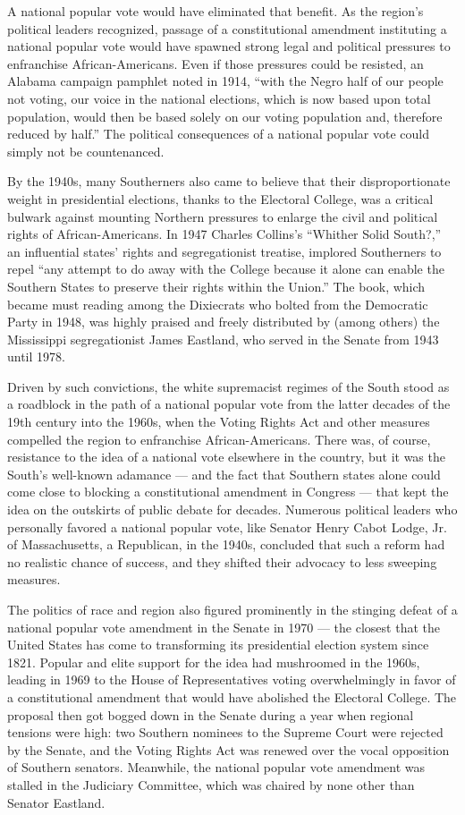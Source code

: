 A national popular vote would have eliminated that benefit. As the
region's political leaders recognized, passage of a constitutional
amendment instituting a national popular vote would have spawned strong
legal and political pressures to enfranchise African-Americans. Even if
those pressures could be resisted, an Alabama campaign pamphlet noted in
1914, ``with the Negro half of our people not voting, our voice in the
national elections, which is now based upon total population, would then
be based solely on our voting population and, therefore reduced by
half.'' The political consequences of a national popular vote could
simply not be countenanced.

By the 1940s, many Southerners also came to believe that their
disproportionate weight in presidential elections, thanks to the
Electoral College, was a critical bulwark against mounting Northern
pressures to enlarge the civil and political rights of
African-Americans. In 1947 Charles Collins's ``Whither Solid South?,''
an influential states' rights and segregationist treatise, implored
Southerners to repel ``any attempt to do away with the College because
it alone can enable the Southern States to preserve their rights within
the Union.'' The book, which became must reading among the Dixiecrats
who bolted from the Democratic Party in 1948, was highly praised and
freely distributed by (among others) the Mississippi segregationist
James Eastland, who served in the Senate from 1943 until 1978.

Driven by such convictions, the white supremacist regimes of the South
stood as a roadblock in the path of a national popular vote from the
latter decades of the 19th century into the 1960s, when the Voting
Rights Act and other measures compelled the region to enfranchise
African-Americans. There was, of course, resistance to the idea of a
national vote elsewhere in the country, but it was the South's
well-known adamance --- and the fact that Southern states alone could
come close to blocking a constitutional amendment in Congress --- that
kept the idea on the outskirts of public debate for decades. Numerous
political leaders who personally favored a national popular vote, like
Senator Henry Cabot Lodge, Jr. of Massachusetts, a Republican, in the
1940s, concluded that such a reform had no realistic chance of success,
and they shifted their advocacy to less sweeping measures.

The politics of race and region also figured prominently in the stinging
defeat of a national popular vote amendment in the Senate in 1970 ---
the closest that the United States has come to transforming its
presidential election system since 1821. Popular and elite support for
the idea had mushroomed in the 1960s, leading in 1969 to the House of
Representatives voting overwhelmingly in favor of a constitutional
amendment that would have abolished the Electoral College. The proposal
then got bogged down in the Senate during a year when regional tensions
were high: two Southern nominees to the Supreme Court were rejected by
the Senate, and the Voting Rights Act was renewed over the vocal
opposition of Southern senators. Meanwhile, the national popular vote
amendment was stalled in the Judiciary Committee, which was chaired by
none other than Senator Eastland.

